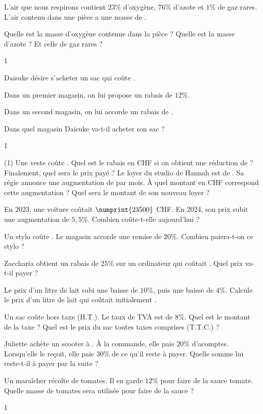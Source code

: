 \documentclass[a4paper,11pt]{report}
\begin{document}
\begin{exo}{
L'air que nous respirons contient $23\%$ d'oxygène, $76\%$ d'azote et $1\%$ de gaz rares. L'air contenu dans une pièce a une masse de .

Quelle est la masse d'oxygène contenue dans la pièce ? Quelle est la masse d'azote ? Et celle de gaz rares ?
}{1}
\end{exo}

\begin{exo}{
Daisuke désire s'acheter un sac qui coûte .

Dans un premier magasin, on lui propose un rabais de $12\%$.

Dans un second magasin, on lui accorde un rabais de .

Dans quel magasin Daisuke va-t-il acheter son sac ?
}{1}
\end{exo}




\begin{exo}{
\begin{tasks}(1)
    \task Une veste coûte . Quel est le rabais en CHF si on obtient une réduction de  ? Finalement, quel sera le prix payé ?
    \task Le loyer du studio de Hannah est de  . Sa régie annonce une augmentation de  par mois. À quel montant en CHF correspond cette augmentation ? Quel sera le montant de son nouveau loyer ?

    \task En 2023, une voiture coûtait $\numprint{23500}$ CHF. En 2024, son prix subit une augmentation de $5,5\%$. Combien coûte-t-elle aujourd'hui ?

    \task Un stylo coûte . Le magasin accorde une remise de $20\%$. Combien paiera-t-on ce stylo ?

    \task Zaccharia obtient un rabais de $25\%$ sur un ordinateur qui coûtait . Quel prix va-t-il payer ?

    \task Le prix d'un litre de lait subi une baisse de $10\%$, puis une baisse de $4\%$. Calcule le prix d'un litre de lait qui coûtait initialement .

    \task Un sac coûte  hors taxe (H.T.). Le taux de TVA est de $8\%$. Quel est le montant de la taxe ? Quel est le prix du sac toutes taxes comprises (T.T.C.) ?

    \task Juliette achète un scooter à . À la commande, elle paie $20\%$ d'acomptes. Lorsqu'elle le reçoit, elle paie $30\%$ de ce qu'il reste à payer. Quelle somme lui reste-t-il à payer par la suite ?

    \task Un maraîcher récolte  de tomates. Il en garde $12\%$ pour faire de la sauce tomate. Quelle masse de tomates sera utilisée pour faire de la sauce ?
\end{tasks}
}{1}    
\end{exo}
\end{document}
